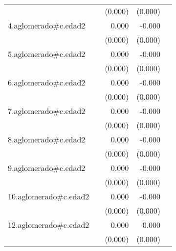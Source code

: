 {\begin{longtable}{l*{4}{D{.}{.}{-1}}}
            &                     &     (0.000)         &     (0.000)         &                     \\
\addlinespace
4.aglomerado#c.edad2&                     &       0.000         &      -0.000\sym{***}&                     \\
            &                     &     (0.000)         &     (0.000)         &                     \\
\addlinespace
5.aglomerado#c.edad2&                     &       0.000\sym{*}  &      -0.000         &                     \\
            &                     &     (0.000)         &     (0.000)         &                     \\
\addlinespace
6.aglomerado#c.edad2&                     &       0.000         &      -0.000         &                     \\
            &                     &     (0.000)         &     (0.000)         &                     \\
\addlinespace
7.aglomerado#c.edad2&                     &       0.000         &      -0.000\sym{**} &                     \\
            &                     &     (0.000)         &     (0.000)         &                     \\
\addlinespace
8.aglomerado#c.edad2&                     &       0.000\sym{*}  &      -0.000         &                     \\
            &                     &     (0.000)         &     (0.000)         &                     \\
\addlinespace
9.aglomerado#c.edad2&                     &       0.000\sym{**} &      -0.000\sym{*}  &                     \\
            &                     &     (0.000)         &     (0.000)         &                     \\
\addlinespace
10.aglomerado#c.edad2&                     &       0.000\sym{**} &      -0.000         &                     \\
            &                     &     (0.000)         &     (0.000)         &                     \\
\addlinespace
12.aglomerado#c.edad2&                     &       0.000\sym{***}&       0.000\sym{*}  &                     \\
            &                     &     (0.000)         &     (0.000)         &                     \\

\end{longtable}}
